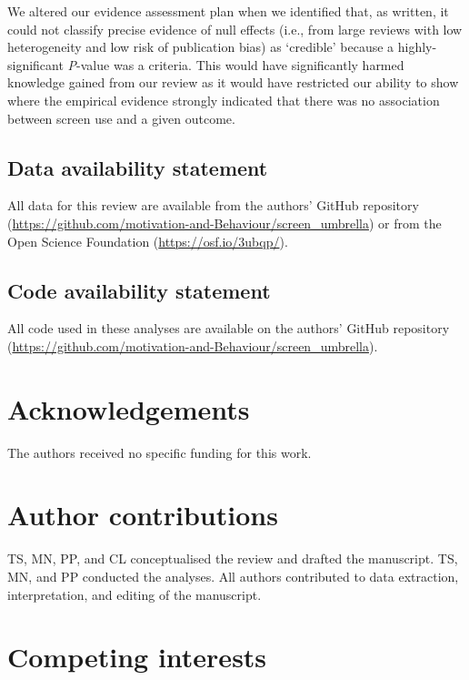 \documentclass[
  english,
  man]{apa6}
\begin{document}
We altered our evidence assessment plan when we identified that, as written, it could not classify precise evidence of null effects (i.e., from large reviews with low heterogeneity and low risk of publication bias) as `credible' because a highly-significant \emph{P}-value was a criteria.
This would have significantly harmed knowledge gained from our review as it would have restricted our ability to show where the empirical evidence strongly indicated that there was no association between screen use and a given outcome.

\hypertarget{data-availability-statement}{%
\subsection{Data availability statement}\label{data-availability-statement}}

All data for this review are available from the authors' GitHub repository (\url{https://github.com/motivation-and-Behaviour/screen_umbrella}) or from the Open Science Foundation (\url{https://osf.io/3ubqp/}).

\hypertarget{code-availability-statement}{%
\subsection{Code availability statement}\label{code-availability-statement}}

All code used in these analyses are available on the authors' GitHub repository (\url{https://github.com/motivation-and-Behaviour/screen_umbrella}).

\hypertarget{acknowledgements}{%
\section{Acknowledgements}\label{acknowledgements}}

The authors received no specific funding for this work.

\hypertarget{author-contributions}{%
\section{Author contributions}\label{author-contributions}}

TS, MN, PP, and CL conceptualised the review and drafted the manuscript.
TS, MN, and PP conducted the analyses.
All authors contributed to data extraction, interpretation, and editing of the manuscript.

\hypertarget{competing-interests}{%
\section{Competing interests}\label{competing-interests}}
\end{document}
